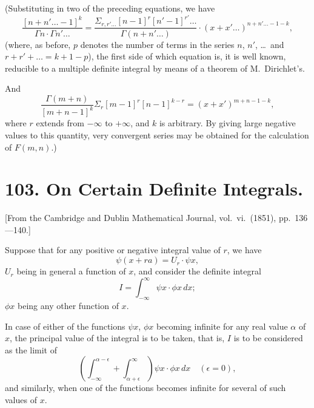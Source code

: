 \documentclass[11pt,a4paper]{book}
\begin{document}
(Substituting in two of the preceding equations, we have
\begin{equation}\frac{[n+n'\ldots-1]^k}{\Gamma n \cdot \Gamma n' \ldots} = \frac{\Sigma_{r,r'\ldots} [n-1]^r [n'-1]^{r'}\ldots}{\Gamma(n+n'\ldots)} \cdot (x+x'\ldots)^{n+n'\ldots-1-k},\tag{8}\end{equation}
(where, as before, $p$ denotes the number of terms in the series $n$, $n'$, \ldots\ and $r+r'+\ldots=k+1-p$), the first side of which equation is, it is well known, reducible to a multiple definite integral by means of a theorem of M.\ Dirichlet's.

And
\begin{equation}\frac{\Gamma(m+n)}{[m+n-1]^k} \Sigma_r [m-1]^r [n-1]^{k-r} = (x+x')^{m+n-1-k},\tag{9}\end{equation}
where $r$ extends from $-\infty$ to $+\infty$, and $k$ is arbitrary. By giving large negative values to this quantity, very convergent series may be obtained for the calculation of $F(m,n)$.)
\clearpage

\section*{103. On Certain Definite Integrals.}

[From the Cambridge and Dublin Mathematical Journal, vol.\ vi.\ (1851), pp.\ 136---140.]

Suppose that for any positive or negative integral value of $r$, we have
\[\psi(x + ra) = U_r \cdot \psi x,\]
$U_r$ being in general a function of $x$, and consider the definite integral
\[I = \int_{-\infty}^{\infty} \psi x \cdot \phi x \, dx;\]
$\phi x$ being any other function of $x$.

In case of either of the functions $\psi x$, $\phi x$ becoming infinite for any real value $\alpha$ of $x$, the principal value of the integral is to be taken, that is, $I$ is to be considered as the limit of
\[\left(\int_{-\infty}^{\alpha-\epsilon} + \int_{\alpha+\epsilon}^{\infty}\right) \psi x \cdot \phi x \, dx \quad (\epsilon = 0),\]
and similarly, when one of the functions becomes infinite for several of such values of $x$.
\end{document}
